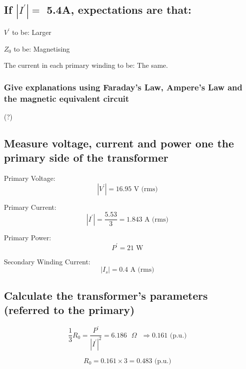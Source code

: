 \documentclass{article}
\begin{document}
\subsection{If $|I^{'} | = $ 5.4A, expectations are that:}

$V^{'}$ to be: Larger

$Z_0$ to be: Magnetising 

The current in each primary winding to be: The same.

\subsubsection{Give explanations using Faraday's Law, Ampere's Law and the magnetic equivalent circuit} 

(?)


\subsection{Measure voltage, current and power one the primary side of the transformer} 

Primary Voltage:
\begin{equation}
  | V^{'} | = 16.95 \text{ V (rms)}
\end{equation}

Primary Current:
\begin{equation}
  | I^{'} | = \frac{5.53}{3} = 1.843 \text{ A (rms)}
\end{equation}

Primary Power:
\begin{equation}
  P^{'} = 21 \text{ W}
\end{equation}

Secondary Winding Current:
\begin{equation}
  | I_{s} | = 0.4 \text{ A (rms)}
\end{equation}

\subsection{Calculate the transformer's parameters (referred to the primary)} 

\begin{equation}
  \frac{1}{3} R_0 = \frac{P^{'}}{|I^{'} |^{2}} = 6.186 \text{ $\Omega$ } \Rightarrow 0.161  \text{ (p.u.)}
\end{equation}

\begin{equation}
  R_0  = 0.161 \times 3 = 0.483 \text{ (p.u.)}
\end{equation}
\end{document}
